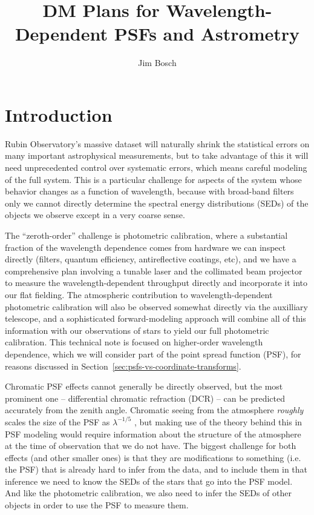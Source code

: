 \documentclass[DM,authoryear,toc]{lsstdoc}
\title{DM Plans for Wavelength-Dependent PSFs and Astrometry}
\author{%
Jim Bosch
}
\date{\vcsDate}
\begin{document}
\maketitle

\section{Introduction}

Rubin Observatory's massive dataset will naturally shrink the statistical errors on many important astrophysical measurements, but to take advantage of this it will need unprecedented control over systematic errors, which means careful modeling of the full system.
This is a particular challenge for aspects of the system whose behavior changes as a function of wavelength, because with broad-band filters only we cannot directly determine the spectral energy distributions (SEDs) of the objects we observe except in a very coarse sense.

The ``zeroth-order'' challenge is photometric calibration, where a substantial fraction of the wavelength dependence comes from hardware we can inspect directly (filters, quantum efficiency, antireflective coatings, etc), and we have a comprehensive plan involving a tunable laser and the collimated beam projector to measure the wavelength-dependent throughput directly and incorporate it into our flat fielding.
The atmospheric contribution to wavelength-dependent photometric calibration will also be observed somewhat directly via the auxilliary telescope, and a sophisticated forward-modeling approach will combine all of this information with our observations of stars to yield our full photometric calibration.
This technical note is focused on higher-order wavelength dependence, which we will consider part of the point spread function (PSF), for reasons discussed in Section~\ref{sec:psfs-vs-coordinate-transforms}.

Chromatic PSF effects cannot generally be directly observed, but the most prominent one -- differential chromatic refraction (DCR) -- can be predicted accurately from the zenith angle.
Chromatic seeing from the atmosphere \emph{roughly} scales the size of the PSF as $\lambda^{-1/5}$ \citep{1966JOSA...56.1372F,2015ApJ...807..182M}, but making use of the theory behind this in PSF modeling would require information about the structure of the atmosphere at the time of observation that we do not have.
The biggest challenge for both effects (and other smaller ones) is that they are modifications to something (i.e. the PSF) that is already hard to infer from the data, and to include them in that inference we need to know the SEDs of the stars that go into the PSF model.
And like the photometric calibration, we also need to infer the SEDs of other objects in order to use the PSF to measure them.
\end{document}
